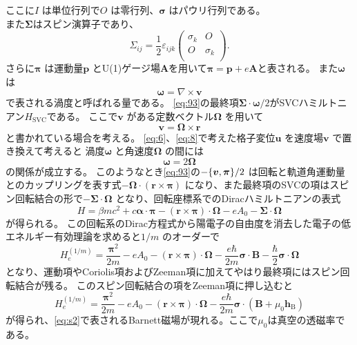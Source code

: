 \documentclass[dvipdfmx,11pt]{jsreport}
\numberwithin{equation}{chapter}
\numberwithin{table}{chapter}
\begin{document}
ここに$I$ は単位行列で$O$ は零行列、$\bm{\sigma}$ はパウリ行列である。
\\また$\bm{\Sigma}$はスピン演算子であり、
\begin{equation}
\label{eq:95}
\Sigma_{ij}=\frac{1}{2}\varepsilon_{ijk}\begin{pmatrix} \sigma_k & O\\O&\sigma_k\\ \end{pmatrix} 
.\end{equation}
さらに$\bm{\pi }$ は運動量$\bm{p}$ とU(1)ゲージ場$\bm{A}$を用いて$\bm{\pi }=\bm{p}+e\bm{A}$と表される。
また$\bm{\omega}$ は
\begin{equation}
\label{eq:96}
	\bm{\omega}=\nabla \times \bm{v}
\end{equation}
で表される渦度と呼ばれる量である。
\eqref{eq:93}の最終項$\bm{\Sigma}\cdot \bm{\omega} /2$がSVCハミルトニアン$H_\text{SVC} $である。
ここで$\bm{v}$ がある定数ベクトル$\bm{\Omega}$ を用いて
\begin{equation}
\label{eq:97}
	\bm{v}=\bm{\Omega}\times \bm{r}
\end{equation}
と書かれている場合を考える。
\eqref{eq:6}、\eqref{eq:8}で考えた格子変位$\bm{u}$ を速度場$\bm{v}$ で置き換えて考えると
渦度$\bm{\omega}$ と角速度$\bm{\Omega}$ の間には
\begin{equation}
\label{eq:98}
	\bm{\omega} = 2\bm{\Omega}
\end{equation}
の関係が成立する。
このようなとき\eqref{eq:93}の$-\acomm{\bm{v}}{\bm{\pi }} /2$ は回転と軌道角運動量とのカップリングを表す式$-\bm{\Omega}\cdot (\bm{r}\times \bm{\pi })$ になり、また最終項のSVCの項はスピン回転結合の形で$-\bm{\Sigma}\cdot \bm{\Omega}$ となり、回転座標系でのDiracハミルトニアンの表式
\begin{equation}
\label{eq:99}
	H=\beta mc^2+c \bm{\alpha}\cdot \bm{\pi }-(\bm{r}\times \bm{\pi })\cdot \bm{\Omega}-eA_0-\bm{\Sigma}\cdot \bm{\Omega}
\end{equation}
が得られる。
この回転系のDirac方程式から陽電子の自由度を消去した電子の低エネルギー有効理論を求めると$1 /m$ のオーダーで
\begin{equation}
\label{eq:100}
	H^{(1 /m)}_e=\frac{\bm{\pi}^2}{2m}-eA_0-(\bm{r}\times \bm{\pi })\cdot \bm{\Omega}-\frac{e\hbar }{2m}\bm{\sigma}\cdot \bm{B}-\frac{\hbar}{2}\bm{\sigma}\cdot  \bm{\Omega}
\end{equation}
となり、運動項やCoriolis項およびZeeman項に加えてやはり最終項にはスピン回転結合が残る。
このスピン回転結合の項をZeeman項に押し込むと
\begin{equation}
\label{eq:101}
H^{(1 /m)}_e=\frac{\bm{\pi}^2}{2m}-eA_0-(\bm{r}\times \bm{\pi })\cdot \bm{\Omega}-\frac{e\hbar }{2m}\bm{\sigma}\cdot (\bm{B}+\mu_0 \bm{h}_\text{B})
\end{equation}
が得られ、\eqref{eq:s2}で表されるBarnett磁場が現れる。ここで$\mu_0$は真空の透磁率である。
\end{document}
